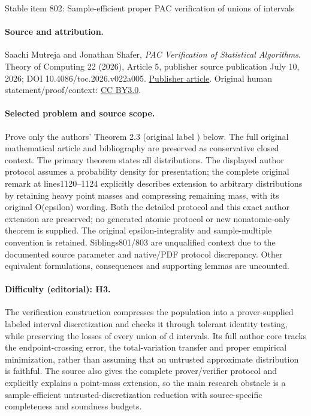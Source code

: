 \documentclass[11pt]{article}
\numberwithin{equation}{section}
\theoremstyle{definition}
\theoremstyle{plain}
\theoremstyle{definition}\newtheorem{notation}[theorem]{Notation}\theoremstyle{plain}\raggedbottom
\newcommand{\1}{\mathds{1}}
\begin{document}
\begin{center}{\Large Stable item 802: Sample-efficient proper PAC verification of unions of intervals}\end{center}
\paragraph{Source and attribution.}
Saachi Mutreja and Jonathan Shafer, \emph{PAC Verification of Statistical Algorithms}. Theory of Computing 22 (2026), Article 5, publisher source publication July 10, 2026; DOI 10.4086/toc.2026.v022a005. \href{https://theoryofcomputing.org/articles/v022a005/}{Publisher article}. Original human statement/proof/context: \href{https://creativecommons.org/licenses/by/3.0/}{CC BY3.0}.
\paragraph{Selected problem and source scope.}
Prove only the authors' Theorem 2.3 (original label ) below. The full original mathematical article and bibliography are preserved as conservative closed context. The primary theorem states all distributions. The displayed author protocol assumes a probability density for presentation; the complete original remark at lines1120--1124 explicitly describes extension to arbitrary distributions by retaining heavy point masses and compressing remaining mass, with its original O(epsilon) wording. Both the detailed protocol and this exact author extension are preserved; no generated atomic protocol or new nonatomic-only theorem is supplied. The original epsilon-integrality and sample-multiple convention is retained. Siblings801/803 are unqualified context due to the documented source parameter and native/PDF protocol discrepancy.  Other equivalent formulations, consequences and supporting lemmas are uncounted.
\paragraph{Difficulty (editorial): H3.}
The verification construction compresses the population into a prover-supplied labeled interval discretization and checks it through tolerant identity testing, while preserving the losses of every union of d intervals. Its full author core tracks the endpoint-crossing error, the total-variation transfer and proper empirical minimization, rather than assuming that an untrusted approximate distribution is faithful. The source also gives the complete prover/verifier protocol and explicitly explains a point-mass extension, so the main research obstacle is a sample-efficient untrusted-discretization reduction with source-specific completeness and soundness budgets.
\end{document}
